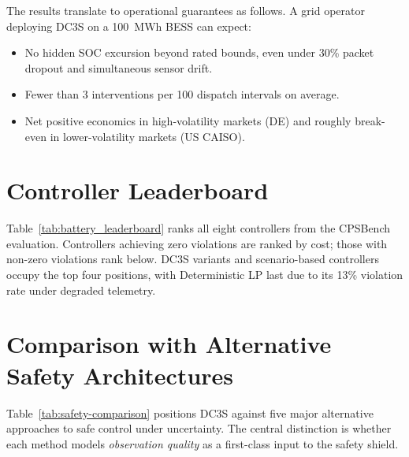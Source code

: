 The results translate to operational guarantees as follows.  A grid operator
deploying DC3S on a 100~MWh BESS can expect:
\begin{itemize}
  \item No hidden SOC excursion beyond rated bounds, even under 30\% packet
    dropout and simultaneous sensor drift.
  \item Fewer than 3 interventions per 100 dispatch intervals on average.
  \item Net positive economics in high-volatility markets (DE) and roughly
    break-even in lower-volatility markets (US CAISO).
\end{itemize}

\section{Controller Leaderboard}

Table~\ref{tab:battery_leaderboard} ranks all eight controllers from the
CPSBench evaluation.  Controllers achieving zero violations are ranked by
cost; those with non-zero violations rank below.  DC3S variants and
scenario-based controllers occupy the top four positions, with
Deterministic LP last due to its 13\% violation rate under degraded
telemetry.


\section{Comparison with Alternative Safety Architectures}
\label{sec:safety-comparison}

Table~\ref{tab:safety-comparison} positions DC3S against five major
alternative approaches to safe control under uncertainty.  The central
distinction is whether each method models \emph{observation quality}
as a first-class input to the safety shield.

